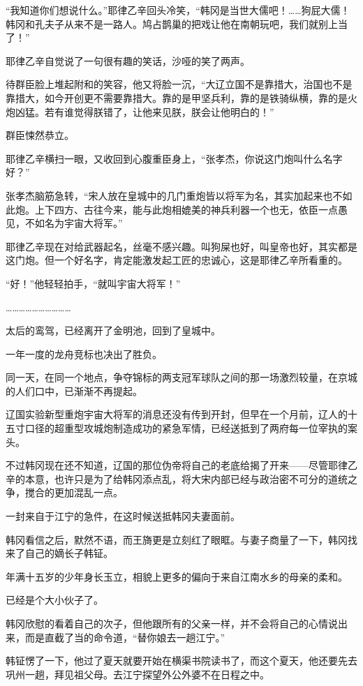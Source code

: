 “我知道你们想说什么。”耶律乙辛回头冷笑，“韩冈是当世大儒吧！……狗屁大儒！韩冈和孔夫子从来不是一路人。鸠占鹊巢的把戏让他在南朝玩吧，我们就别上当了！”

耶律乙辛自觉说了一句很有趣的笑话，沙哑的笑了两声。

待群臣脸上堆起附和的笑容，他又将脸一沉，“大辽立国不是靠措大，治国也不是靠措大，如今开创更不需要靠措大。靠的是甲坚兵利，靠的是铁骑纵横，靠的是火炮凶猛。若有谁觉得朕错了，让他来见朕，朕会让他明白的！”

群臣悚然恭立。

耶律乙辛横扫一眼，又收回到心腹重臣身上，“张孝杰，你说这门炮叫什么名字好？”

张孝杰脑筋急转，“宋人放在皇城中的几门重炮皆以将军为名，其实加起来也不如此炮。上下四方、古往今来，能与此炮相媲美的神兵利器一个也无，依臣一点愚见，不如名为宇宙大将军。”

耶律乙辛现在对给武器起名，丝毫不感兴趣。叫狗屎也好，叫皇帝也好，其实都是这门炮。但一个好名字，肯定能激发起工匠的忠诚心，这是耶律乙辛所看重的。

“好！”他轻轻拍手，“就叫宇宙大将军！”

…………………………

太后的鸾驾，已经离开了金明池，回到了皇城中。

一年一度的龙舟竞标也决出了胜负。

同一天，在同一个地点，争夺锦标的两支冠军球队之间的那一场激烈较量，在京城的人们口中，已渐渐不再提起。

辽国实验新型重炮宇宙大将军的消息还没有传到开封，但早在一个月前，辽人的十五寸口径的超重型攻城炮制造成功的紧急军情，已经送抵到了两府每一位宰执的案头。

不过韩冈现在还不知道，辽国的那位伪帝将自己的老底给揭了开来——尽管耶律乙辛的本意，也许只是为了给韩冈添点乱，将大宋内部已经与政治密不可分的道统之争，搅合的更加混乱一点。

一封来自于江宁的急件，在这时候送抵韩冈夫妻面前。

韩冈看信之后，默然不语，而王旖更是立刻红了眼眶。与妻子商量了一下，韩冈找来了自己的嫡长子韩钲。

年满十五岁的少年身长玉立，相貌上更多的偏向于来自江南水乡的母亲的柔和。

已经是个大小伙子了。

韩冈欣慰的看着自己的次子，但他跟所有的父亲一样，并不会将自己的心情说出来，而是直截了当的命令道，“替你娘去一趟江宁。”

韩钲愣了一下，他过了夏天就要开始在横渠书院读书了，而这个夏天，他还要先去巩州一趟，拜见祖父母。去江宁探望外公外婆不在日程之中。

